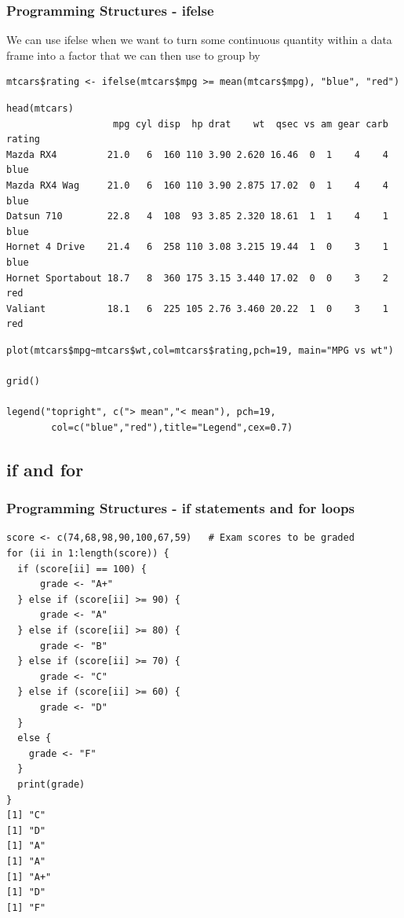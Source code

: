 \documentclass{beamer}
\begin{document}
%

\begin{frame}[fragile]
\frametitle{Programming Structures - ifelse}
We can use ifelse when we want to turn some continuous quantity within a data frame into a factor that we can then use to group by
\footnotesize
\begin{verbatim}
mtcars$rating <- ifelse(mtcars$mpg >= mean(mtcars$mpg), "blue", "red")
\end{verbatim}
\scriptsize
\begin{verbatim}
head(mtcars)
                   mpg cyl disp  hp drat    wt  qsec vs am gear carb rating
Mazda RX4         21.0   6  160 110 3.90 2.620 16.46  0  1    4    4   blue
Mazda RX4 Wag     21.0   6  160 110 3.90 2.875 17.02  0  1    4    4   blue
Datsun 710        22.8   4  108  93 3.85 2.320 18.61  1  1    4    1   blue
Hornet 4 Drive    21.4   6  258 110 3.08 3.215 19.44  1  0    3    1   blue
Hornet Sportabout 18.7   8  360 175 3.15 3.440 17.02  0  0    3    2    red
Valiant           18.1   6  225 105 2.76 3.460 20.22  1  0    3    1    red
\end{verbatim}
\footnotesize
\begin{verbatim}
plot(mtcars$mpg~mtcars$wt,col=mtcars$rating,pch=19, main="MPG vs wt")

grid()

legend("topright", c("> mean","< mean"), pch=19,
        col=c("blue","red"),title="Legend",cex=0.7)
\end{verbatim}
\end{frame}
%

\subsection{if and for}
\begin{frame}[fragile]
\frametitle{Programming Structures - if statements and for loops}
\scriptsize
\begin{verbatim}
score <- c(74,68,98,90,100,67,59)   # Exam scores to be graded
for (ii in 1:length(score)) {
  if (score[ii] == 100) {
      grade <- "A+"
  } else if (score[ii] >= 90) {
      grade <- "A"
  } else if (score[ii] >= 80) {
      grade <- "B"
  } else if (score[ii] >= 70) {
      grade <- "C"
  } else if (score[ii] >= 60) {
      grade <- "D"
  }
  else {
    grade <- "F"
  }
  print(grade)
}
[1] "C"
[1] "D"
[1] "A"
[1] "A"
[1] "A+"
[1] "D"
[1] "F"
\end{verbatim}
\end{frame}
\end{document}
